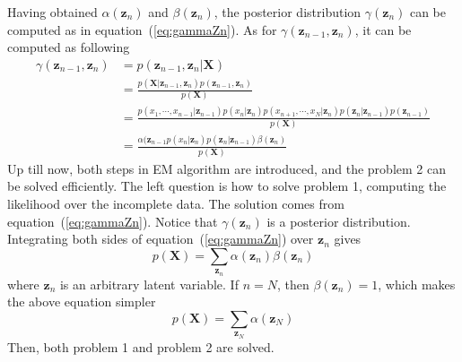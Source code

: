 Having obtained \(\alpha(\mathbf{z}_n)\) and \(\beta(\mathbf{z}_n)\), the posterior distribution \(\gamma(\mathbf{z}_n)\) can be computed as in equation~(\ref{eq:gammaZn}). As for \(\gamma(\mathbf{z}_{n-1}, \mathbf{z}_n)\), it can be computed as following
\begin{align}
\gamma(\mathbf{z}_{n-1}, \mathbf{z}_n) &= p(\mathbf{z}_{n-1}, \mathbf{z}_n | \mathbf{X}) \nonumber \\
									   & = \frac{p(\mathbf{X} | \mathbf{z}_{n-1}, \mathbf{z}_n)p(\mathbf{z}_{n-1}, \mathbf{z}_n)}{p(\mathbf{X})}\nonumber \\
									   & = \frac{p(x_1, \cdots, x_{n-1} | \mathbf{z}_{n-1}) p(x_n | \mathbf{z}_n) p(x_{n+1}, \cdots, x_N | \mathbf{z}_n)
									   			 p(\mathbf{z}_n | \mathbf{z}_{n-1}) p(\mathbf{z}_{n-1})}{p(\mathbf{X})}\nonumber \\
									   & = \frac{\alpha(\mathbf{z}_{n-1}p(x_n|\mathbf{z}_n)p(\mathbf{z}_n|\mathbf{z}_{n-1})\beta(\mathbf{z}_n)}{p(\mathbf{X})}
\end{align}
Up till now, both steps in EM algorithm are introduced, and the problem 2 can be solved efficiently. The left question is how to solve problem 1, computing the likelihood over the incomplete data. The solution comes from  equation~(\ref{eq:gammaZn}). Notice that \(\gamma(\mathbf{z}_n)\) is a posterior distribution. Integrating both sides of equation~(\ref{eq:gammaZn}) over \(\mathbf{z}_n\) gives
\begin{equation}
	p(\mathbf{X}) = \sum_{\mathbf{z}_n} \alpha(\mathbf{z}_n)\beta(\mathbf{z}_n)
\end{equation}
where \(\mathbf{z}_n\) is an arbitrary latent variable. If \(n = N\), then \(\beta(\mathbf{z}_n) = 1\), which makes the above equation simpler
\begin{equation}
	p(\mathbf{X}) = \sum_{\mathbf{z}_N} \alpha(\mathbf{z}_N)
\end{equation}
Then, both problem 1 and problem 2 are solved.




